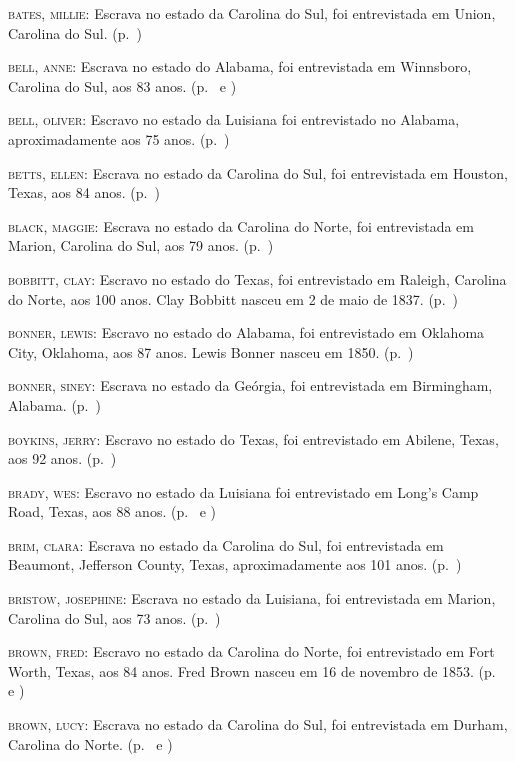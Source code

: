 \begin{Parskip}
\textsc{bates, millie:} Escrava no estado da Carolina do Sul, foi
entrevistada em Union, Carolina do Sul. (p.~\pageref{ref21})

\textsc{bell, anne:} Escrava no estado do Alabama, foi entrevistada em
Winnsboro, Carolina do Sul, aos 83 anos. (p.~\pageref{ref22} e \pageref{ref23})

\textsc{bell, oliver:} Escravo no estado da Luisiana foi entrevistado no
Alabama, aproximadamente aos 75 anos. (p.~\pageref{ref24})

\textsc{betts, ellen:} Escrava no estado da Carolina do Sul, foi
entrevistada em Houston, Texas, aos 84 anos. (p.~\pageref{ref25})

\textsc{black, maggie:} Escrava no estado da Carolina do Norte, foi
entrevistada em Marion, Carolina do Sul, aos 79 anos. (p.~\pageref{ref26})

\textsc{bobbitt, clay:} Escravo no estado do Texas, foi entrevistado em
Raleigh, Carolina do Norte, aos 100 anos. Clay Bobbitt nasceu em 2 de
maio de 1837. (p.~\pageref{ref27})

\textsc{bonner, lewis:} Escravo no estado do Alabama, foi entrevistado
em Oklahoma City, Oklahoma, aos 87 anos. Lewis Bonner nasceu em 1850. (p.~\pageref{ref28})

\textsc{bonner, siney:} Escrava no estado da Geórgia, foi entrevistada
em Birmingham, Alabama. (p.~\pageref{ref29})

\textsc{boykins, jerry:} Escravo no estado do Texas, foi entrevistado em
Abilene, Texas, aos 92 anos. (p.~\pageref{ref30})

\textsc{brady, wes:} Escravo no estado da Luisiana foi entrevistado em
Long's Camp Road, Texas, aos 88 anos. (p.~\pageref{ref31} e \pageref{ref32})

\textsc{brim, clara:} Escrava no estado da Carolina do Sul, foi
entrevistada em Beaumont, Jefferson County, Texas, aproximadamente aos
101 anos. (p.~\pageref{ref33})

\textsc{bristow, josephine:} Escrava no estado da Luisiana, foi
entrevistada em Marion, Carolina do Sul, aos 73 anos. (p.~\pageref{ref34})

\textsc{brown, fred:} Escravo no estado da Carolina do Norte, foi
entrevistado em Fort Worth, Texas, aos 84 anos. Fred Brown nasceu em 16
de novembro de 1853. (p.~\pageref{ref35} e \pageref{ref36})

\textsc{brown, lucy:} Escrava no estado da Carolina do Sul, foi
entrevistada em Durham, Carolina do Norte. (p.~\pageref{ref37} e \pageref{ref38})


\end{Parskip}

